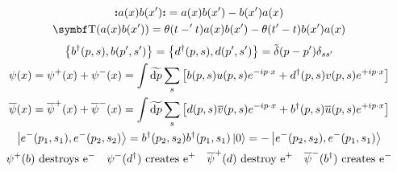 \begin{gather*}
        \nord{a(x)b(x')} = a(x)b(x') - b(x')a(x)
        \\
        \Tordp(a(x)b(x')) = \theta(t-'t)a(x)b(x') - \theta(t'-t)b(x')a(x)
\end{gather*}
\begin{gather*}
        \acomm{b^\dagger\qty(p,s)}{b\qty(p',s')}
        = \acomm{d^\dagger\qty(p,s)}{d\qty(p',s')}
        = \Tdelta(p-p')\delta_{ss'}
        \\
        \psi(x)
        = \psi^+(x) + \psi^-(x)
        = \int\Tdd{p}\sum_s \qty[b(p,s)u(p,s)e^{-ip\cdot x} + d^\dagger(p,s)v(p,s)e^{+ip\cdot x}]
        \\
        \overline{\psi}(x)
        = \overline{\psi}^+(x) + \overline{\psi}^-(x)
        = \int\Tdd{p}\sum_s \qty[d(p,s)\overline{v}(p,s)e^{-ip\cdot x} + b^\dagger(p,s)\overline{u}(p,s)e^{+ip\cdot x}]
        \\
        \ket{e^-(p_1,s_1),e^-(p_2,s_2)} = b^\dagger(p_2,s_2)b^\dagger(p_1,s_1)\ket{0} = -\ket{e^-(p_2,s_2),e^-(p_1,s_1)}
        \\
        \psi^+(b) \text{ destroys } \ce{e^-}
        \quad
        \psi^-(d^\dagger) \text{ creates } \ce{e^+}
        \quad
        \overline{\psi}^+(d) \text{ destroy } \ce{e^+}
        \quad
        \overline{\psi}^-(b^\dagger) \text{ creates } \ce{e^-}
\end{gather*}
